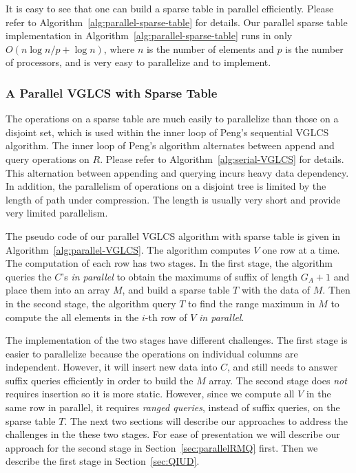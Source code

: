 It is easy to see that one can build a sparse table in parallel
efficiently.  Please refer to
Algorithm~\ref{alg:parallel-sparse-table} for details.  Our parallel
sparse table implementation in
Algorithm~\ref{alg:parallel-sparse-table} runs in only $O(n \log n / p
+ \log n)$, where $n$ is the number of elements and $p$ is the number
of processors, and is very easy to parallelize and to implement.



\subsubsection{A Parallel VGLCS with Sparse Table}


The operations on a sparse table are much easily to parallelize than
those on a disjoint set, which is used within the inner loop of Peng's
sequential VGLCS algorithm.  The inner loop of Peng's algorithm
alternates between append and query operations on $R$.  Please refer
to Algorithm~\ref{alg:serial-VGLCS} for details.  This alternation
between appending and querying incurs heavy data dependency.  In
addition, the parallelism of operations on a disjoint tree is limited
by the length of path under compression.  The length is usually very
short and provide very limited parallelism.

The pseudo code of our parallel VGLCS algorithm with sparse table is
given in Algorithm~\ref{alg:parallel-VGLCS}.  The algorithm computes
$V$ one row at a time.  The computation of each row has two stages.
In the first stage, the algorithm queries the $C$'s {\em in parallel}
to obtain the maximums of suffix of length $G_A + 1$ and place them
into an array $M$, and build a sparse table $T$ with the data of $M$.
Then in the second stage, the algorithm query $T$ to find the range
maximum in $M$ to compute the all elements in the $i$-th row of $V$
{\em in parallel}.



The implementation of the two stages have different challenges.  The
first stage is easier to parallelize because the operations on
individual columns are independent.  However, it will insert new data
into $C$, and still needs to answer suffix queries efficiently in
order to build the $M$ array.  The second stage does {\em not}
requires insertion so it is more static.  However, since we compute
all $V$ in the same row in parallel, it requires {\em ranged queries},
instead of suffix queries, on the sparse table $T$.  The next two
sections will describe our approaches to address the challenges in the
these two stages.  For ease of presentation we will describe our
approach for the second stage in Section~\ref{sec:parallelRMQ} first.
Then we describe the first stage in Section~\ref{sec:QIUD}.
